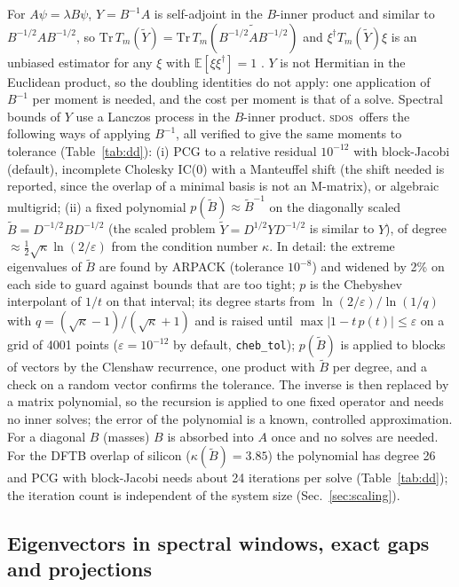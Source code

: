 \documentclass[reprint,nofootinbib,superscriptaddress,amsmath,amssymb,aps,prb,floatfix]{revtex4-2}
\newcommand{\sdos}{\textsc{sdos}}
\newcommand{\Tr}{\mathrm{Tr}}
\begin{document}
For $A\psi=\lambda B\psi$, $Y=B^{-1}A$ is self-adjoint in the $B$-inner product and similar to $B^{-1/2}AB^{-1/2}$, so $\Tr\,T_m(\tilde Y)=\Tr\,T_m(\widetilde{B^{-1/2}AB^{-1/2}})$ and $\xi^\dagger T_m(\tilde Y)\xi$ is an unbiased estimator for any $\xi$ with $\mathbb E[\xi\xi^\dagger]=1$ \cite{roder1996}.
$Y$ is not Hermitian in the Euclidean product, so the doubling identities do not apply: one application of $B^{-1}$ per moment is needed, and the cost per moment is that of a solve.
Spectral bounds of $Y$ use a Lanczos process in the $B$-inner product.
\sdos\ offers the following ways of applying $B^{-1}$, all verified to give the same moments to tolerance (Table~\ref{tab:dd}):
(i) PCG to a relative residual $10^{-12}$ with block-Jacobi (default), incomplete Cholesky IC(0) with a Manteuffel shift \cite{meijerink,manteuffel} (the shift needed is reported, since the overlap of a minimal basis is not an \mbox{M-matrix}), or algebraic multigrid;
(ii) a fixed polynomial $p(\tilde B)\approx\tilde B^{-1}$ on the diagonally scaled $\tilde B=D^{-1/2}BD^{-1/2}$ (the scaled problem $\tilde Y=D^{1/2}YD^{-1/2}$ is similar to $Y$), of degree $\approx\tfrac12\sqrt\kappa\ln(2/\varepsilon)$ from the condition number $\kappa$. In detail: the extreme eigenvalues of $\tilde B$ are found by ARPACK (tolerance $10^{-8}$) and widened by 2\% on each side to guard against bounds that are too tight; $p$ is the Chebyshev interpolant of $1/t$ on that interval; its degree starts from $\ln(2/\varepsilon)/\ln(1/q)$ with $q=(\sqrt\kappa-1)/(\sqrt\kappa+1)$ and is raised until $\max|1-t\,p(t)|\le\varepsilon$ on a grid of 4001 points ($\varepsilon=10^{-12}$ by default, \texttt{cheb\_tol}); $p(\tilde B)$ is applied to blocks of vectors by the Clenshaw recurrence, one product with $\tilde B$ per degree, and a check on a random vector confirms the tolerance. The inverse is then replaced by a matrix polynomial, so the recursion is applied to one fixed operator and needs no inner solves; the error of the polynomial is a known, controlled approximation.
For a diagonal $B$ (masses) $B$ is absorbed into $A$ once and no solves are needed.
For the DFTB overlap of silicon ($\kappa(\tilde B)=3.85$) the polynomial has degree 26 and PCG with block-Jacobi needs about 24 iterations per solve (Table~\ref{tab:dd}); the iteration count is independent of the system size (Sec.~\ref{sec:scaling}).

\subsection{Eigenvectors in spectral windows, exact gaps and projections}
\label{sec:windows}
\end{document}
